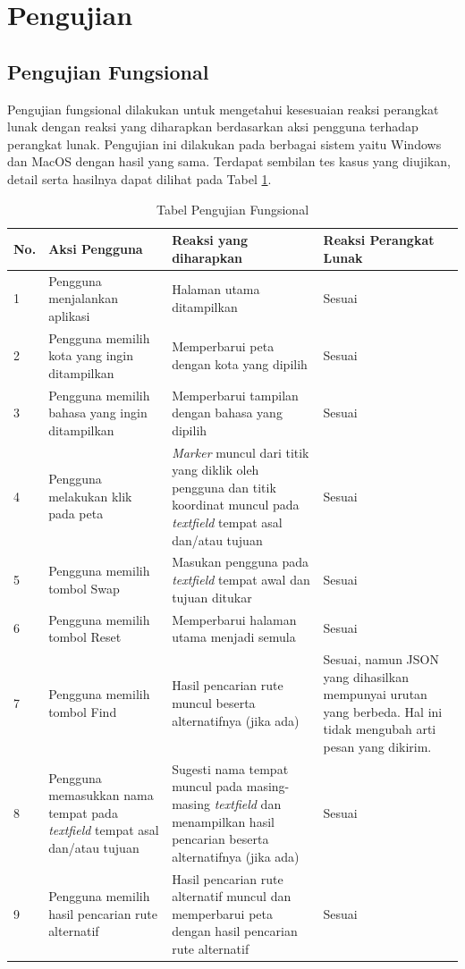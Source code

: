 \section{Pengujian}
\subsection{Pengujian Fungsional}

Pengujian fungsional dilakukan untuk mengetahui kesesuaian reaksi perangkat lunak dengan reaksi yang diharapkan berdasarkan aksi pengguna terhadap perangkat lunak. Pengujian ini dilakukan pada berbagai sistem yaitu Windows dan MacOS dengan hasil yang sama. Terdapat sembilan tes kasus yang diujikan, detail serta hasilnya dapat dilihat pada Tabel \ref{table:hasilFungsional}.
			
\begin{table}[H]
	\centering
	\caption{Tabel Pengujian Fungsional}
		\begin{tabular}{|p{0.25cm}| p{3.5cm}| p{7cm}| p{2.5cm}|} \hline
		No.	&	Aksi Pengguna	&	Reaksi yang diharapkan	&	Reaksi Perangkat Lunak \\ \hline
		1 & Pengguna menjalankan aplikasi & Halaman utama ditampilkan & Sesuai \\ \hline
2 & Pengguna memilih kota yang ingin ditampilkan & Memperbarui peta dengan kota yang dipilih & Sesuai \\ \hline
3 & Pengguna memilih bahasa yang ingin ditampilkan & Memperbarui tampilan dengan bahasa yang dipilih & Sesuai \\ \hline
4 & Pengguna melakukan klik pada peta & \textit{Marker} muncul dari titik yang diklik oleh pengguna dan titik koordinat muncul pada \textit{textfield} tempat asal dan/atau tujuan & Sesuai \\ \hline
5 & Pengguna memilih tombol Swap & Masukan pengguna pada \textit{textfield} tempat awal dan tujuan ditukar & Sesuai \\ \hline
6 & Pengguna memilih tombol Reset & Memperbarui halaman utama menjadi semula & Sesuai \\ \hline
7 & Pengguna memilih tombol Find & Hasil pencarian rute muncul beserta alternatifnya (jika ada) & Sesuai, namun JSON yang dihasilkan mempunyai urutan yang berbeda. Hal ini tidak mengubah arti pesan yang dikirim. \\ \hline
8 & Pengguna memasukkan nama tempat pada \textit{textfield} tempat asal dan/atau tujuan & Sugesti nama tempat muncul pada masing-masing \textit{textfield} dan menampilkan hasil pencarian beserta alternatifnya (jika ada) & Sesuai \\ \hline
9 & Pengguna memilih hasil pencarian rute alternatif & Hasil pencarian rute alternatif muncul dan memperbarui peta dengan hasil pencarian rute alternatif & Sesuai \\ \hline
		
		\end{tabular}
	\label{table:hasilFungsional}
\end{table}


